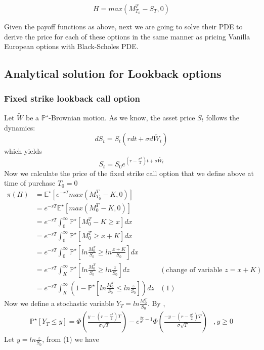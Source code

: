 \documentclass{article}
\begin{document}
\[
H=max(M_{T_0}^T - S_T, 0)
\]

Given the payoff functions as above, next we are going to solve their PDE to derive the price for each of these options in the same manner as pricing Vanilla European options with Black-Scholes PDE.

\subsection{Analytical solution for Lookback options
}
\subsubsection{Fixed strike lookback call option
}
Let $\widetilde{W}$ be a $\mathbb{P}^{\star}$-Brownian motion. As we know, the asset price $S_t$ follows the dynamics:
\[
dS_t=S_t(rdt + \sigma d \widetilde{W_t})
\]
which yields
\[
S_t=S_0 e^{(r - \frac{\sigma^2}{2})t + \sigma \widetilde{W_t}}
\]
Now we calculate the price of the fixed strike call option that we define above at time of purchase $T_0=0$
\begin{align*}
\pi(H) 	&= \mathbb{E^{\star}}[e^{-rT} max(M_{T_0}^T - K, 0)] \\
			&= e^{-rT} \mathbb{E^{\star}}[max(M_{0}^T - K, 0)] \\
			&= e^{-rT} \int_{0}^{\infty} \mathbb{P}^{\star}[M_{0}^T - K \geq x]dx \\
			&= e^{-rT} \int_{0}^{\infty} \mathbb{P}^{\star}[M_{0}^T \geq x+K]dx \\
			&= e^{-rT} \int_{0}^{\infty} \mathbb{P}^{\star}[ln \frac{M_{0}^T}{S_0} \geq ln \frac{x+K}{S_0}]dx \\
			&= e^{-rT} \int_{K}^{\infty} \mathbb{P}^{\star}[ln \frac{M_{0}^T}{S_0} \geq ln \frac{z}{S_0}]dz &(\text{change of variable } z=x+K) \\
			&= e^{-rT} \int_{K}^{\infty} ( 1 - \mathbb{P}^{\star}[ln \frac{M_{0}^T}{S_0} \leq ln \frac{z}{S_0}])dz &(1)
\end{align*}
Now we define a stochastic variable $Y_T= ln \frac{M_{0}^{T}}{S_0}$. By \cite{Peter1},
\begin{align*}
\mathbb{P}^{\star}[Y_T \leq y]= \Phi \left(\frac{y-(r-\frac{\sigma^2}{2})T}{\sigma\sqrt{T}} \right) - e^{\frac{2r}{\sigma^2} - 1} \Phi \left(\frac{-y-(r-\frac{\sigma^2}{2})T}{\sigma\sqrt{T}} \right)
&, y \geq 0
\end{align*}
Let $y=ln\frac{z}{S_0}$, from (1) we have
\end{document}
